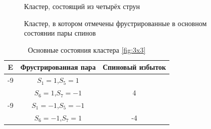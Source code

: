 \documentclass[utf8, babel, sor, jor, amsmath,amssymb, reprint]{elsarticle} %
\begin{document}
\begin{figure}
	\centering
	\caption{Кластер, состоящий из четырёх струн}
	\label{fig:cl}
\end{figure}

\begin{figure}
	\centering
	\caption{Кластер, в котором отмечены фрустрированные в основном состоянии пары спинов}
	\label{fig:clF}
\end{figure}

\begin{table}[h]
	\centering
	\begin{tabular}{|c|c|c|}
		\hline
		E   &   Фрустрированная пара & Спиновый избыток\\
		\hline
		-9   &  $S_1=1$,$S_5=1$&\\
		&    $S_6=1$,$S_7=-1$ & 4\\
		\hline
		-9   &  $S_1=-1$,$S_5=-1$&\\
		&    $S_6=-1$,$S_7=1$ & -4\\
		\hline
	\end{tabular}
	\caption{Основные состояния кластера \ref{fig:3x3}}
	\label{tab:gscl}
\end{table} 
\end{document}
